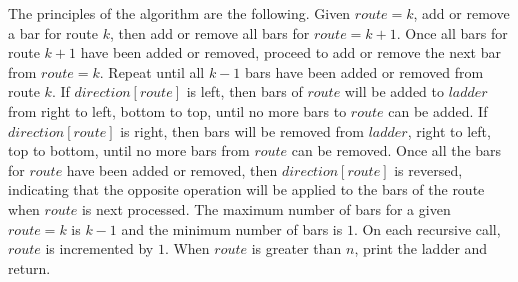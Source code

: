 \pagebreak


The principles of the algorithm are the following. Given $route=k$, add or remove a bar for route $k$, then add or remove 
all bars for $route=k+1$. Once all bars for route $k+1$ have been added or removed, 
proceed to add or remove the next bar from $route=k$. Repeat until all $k-1$ bars have been added or removed from route $k$.
If $direction[route]$ is left, then bars of $route$ will be added to 
$ladder$ from right to left, bottom to top, until no more bars to $route$ can be added.
If $direction[route]$ is right, then bars will be removed from $ladder$, right to left, top to bottom, until 
no more bars from $route$ can be removed. Once all the bars for $route$ have 
been added or removed, then $direction[route]$ is reversed,
indicating that the opposite operation will be applied to the bars of the route when 
$route$ is next processed. The maximum number of bars for a given $route=k$ is $k-1$ and the minimum number of 
bars is $1$. On each recursive call, $route$ is 
incremented by $1$. When $route$ is greater than $n$, print the ladder 
and return. 


